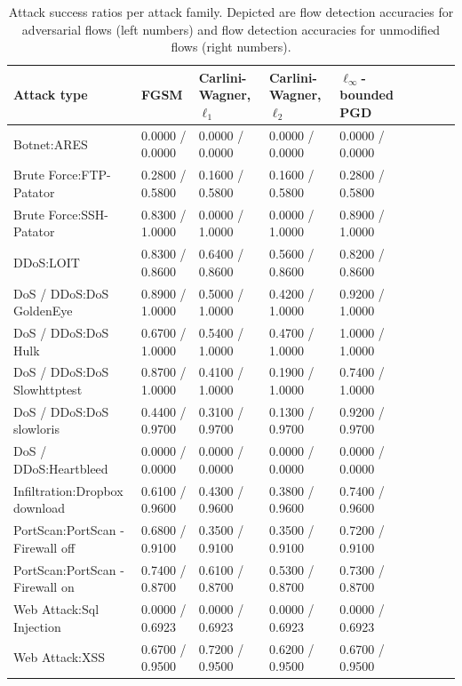 \documentclass[sigconf,nonacm]{acmart}
\begin{document}
\begin{table}
\caption{Attack success ratios per attack family. Depicted are flow detection accuracies for adversarial flows (left numbers) and flow detection accuracies for unmodified flows (right numbers).}
\label{tab:adv_per_family}
\begin{tabular}{lllllllll} 
\toprule
Attack type & FGSM & Carlini-Wagner, $\ell_1$ & Carlini-Wagner, $\ell_2$ & $\ell_\infty$-bounded PGD \\
\midrule
Botnet:ARES	&	0.0000 / 0.0000	&	0.0000 / 0.0000	&	0.0000 / 0.0000	&	0.0000 / 0.0000	\\
Brute Force:FTP-Patator	&	0.2800 / 0.5800	&	0.1600 / 0.5800	&	0.1600 / 0.5800	&	0.2800 / 0.5800	\\
Brute Force:SSH-Patator	&	0.8300 / 1.0000	&	0.0000 / 1.0000	&	0.0000 / 1.0000	&	0.8900 / 1.0000	\\
DDoS:LOIT	&	0.8300 / 0.8600	&	0.6400 / 0.8600	&	0.5600 / 0.8600	&	0.8200 / 0.8600	\\
DoS / DDoS:DoS GoldenEye	&	0.8900 / 1.0000	&	0.5000 / 1.0000	&	0.4200 / 1.0000	&	0.9200 / 1.0000	\\
DoS / DDoS:DoS Hulk	&	0.6700 / 1.0000	&	0.5400 / 1.0000	&	0.4700 / 1.0000	&	1.0000 / 1.0000	\\
DoS / DDoS:DoS Slowhttptest	&	0.8700 / 1.0000	&	0.4100 / 1.0000	&	0.1900 / 1.0000	&	0.7400 / 1.0000	\\
DoS / DDoS:DoS slowloris	&	0.4400 / 0.9700	&	0.3100 / 0.9700	&	0.1300 / 0.9700	&	0.9200 / 0.9700	\\
DoS / DDoS:Heartbleed	&	0.0000 / 0.0000	&	0.0000 / 0.0000	&	0.0000 / 0.0000	&	0.0000 / 0.0000	\\
Infiltration:Dropbox download 	&	0.6100 / 0.9600	&	0.4300 / 0.9600	&	0.3800 / 0.9600	&	0.7400 / 0.9600	\\
PortScan:PortScan - Firewall off	&	0.6800 / 0.9100	&	0.3500 / 0.9100	&	0.3500 / 0.9100	&	0.7200 / 0.9100	\\
PortScan:PortScan - Firewall on	&	0.7400 / 0.8700	&	0.6100 / 0.8700	&	0.5300 / 0.8700	&	0.7300 / 0.8700	\\
Web Attack:Sql Injection	&	0.0000 / 0.6923	&	0.0000 / 0.6923	&	0.0000 / 0.6923	&	0.0000 / 0.6923	\\
Web Attack:XSS	&	0.6700 / 0.9500	&	0.7200 / 0.9500	&	0.6200 / 0.9500	&	0.6700 / 0.9500	\\
\bottomrule

\end{tabular}
\end{table}
\end{document}
